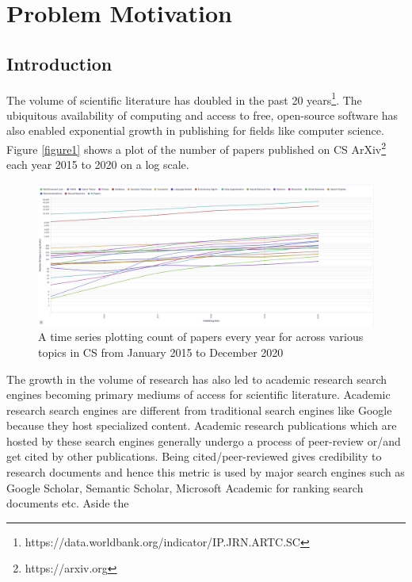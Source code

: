 \chapter{Problem Motivation}

\section{Introduction}    

The volume of scientific literature has doubled in the past 20 years\footnote{https://data.worldbank.org/indicator/IP.JRN.ARTC.SC}.  
The ubiquitous availability of computing and access to free, open-source software has also enabled exponential growth in publishing for fields like computer science.  
Figure \ref{figure1} shows a plot of the number of papers published on CS ArXiv\footnote{https://arxiv.org} each year 2015 to 2020 on a log scale. 

\begin{figure}[h]
    \centering
    \includegraphics[width=\maxwidth{\textwidth}]{src/images/cs-growth-trend-annual.png}
    \caption{ A time series plotting count of papers every year for across various topics in CS from January 2015 to December 2020}
    \label{figure\arabic{figurecounter}}
\end{figure}

The growth in the volume of research has also led to academic research search engines becoming primary mediums of access for scientific literature. 
Academic research search engines are different from traditional search engines like Google because they host specialized content. 
Academic research publications which are hosted by these search engines generally undergo a process of peer-review or/and get cited by other publications. 
Being cited/peer-reviewed gives credibility to research documents and hence this metric is used by major search engines such as Google Scholar, Semantic Scholar, Microsoft Academic for ranking search documents etc. Aside the 


